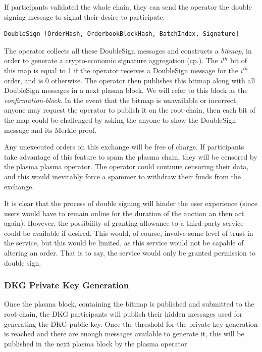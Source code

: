 \documentclass[11pt,parskip=full]{scrartcl}%
\begin{document}
If participants validated the whole chain, they can send the operator the double signing message to signal their desire to participate. 
\begin{verbatim}
DoubleSign [OrderHash, OrderbookBlockHash, BatchIndex, Signature]
\end{verbatim}

The operator collects all these DoubleSign messages and constructs a \emph{bitmap}, in order to generate a crypto-economic signature aggregation (cp.\cite{sig}). 
The $i^{th}$ bit of this map is equal to 1 if the operator receives a DoubleSign message for the $i^{th}$ order, and is 0 otherwise.
The operator then publishes this bitmap along with all DoubleSign messages in a next plasma block. We will refer to this block as the \emph{confirmation-block}.\newline
In the event that the bitmap is unavailable or incorrect, anyone may request the operator to publish it on the root-chain, then each bit of the map could be challenged by asking the anyone to show the DoubleSign message and its Merkle-proof. 

Any unexecuted orders on this exchange will be free of charge.  
If participants take advantage of this feature to spam the plasma chain, they will be censored by the plasma plasma operator.
The operator could continue censoring their data, and this would inevitably force a spammer to withdraw their funds from the exchange.

It is clear that the process of double signing will hinder the user experience (since users would have to remain online for the duration of the auction an then act again). 
However, the possibility of granting allowance to a third-party service could be available if desired.
This would, of course, involve some level of trust in the service, but this would be limited, as this service would not be capable of altering an order. That is to say, the service would only be granted permission to double sign.

\subsubsection{DKG Private Key Generation}
Once the plasma block, containing the bitmap is published and submitted to the root-chain, the DKG participants will publish their hidden messages used for generating the DKG-public key. 
Once the threshold for the private key generation is reached and there are enough messages available to generate it, this will be published in the next plasma block by the plasma operator. 
\end{document}
